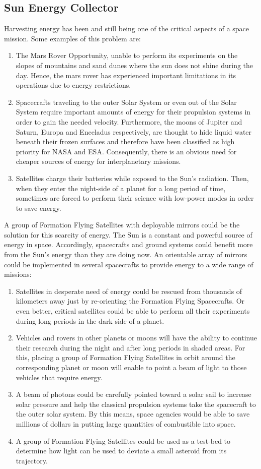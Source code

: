 \subsection{Sun Energy Collector}

Harvesting energy has been and still being one of the critical aspects
of a space mission. Some examples of this problem are: 
\begin{enumerate}
\item The Mars Rover Opportunity, unable to perform its experiments on the
slopes of mountains and sand dunes where the sun does not shine during
the day. Hence, the mars rover has experienced important limitations
in its operations due to energy restrictions.
\item Spacecrafts traveling to the outer Solar System or even out of the
Solar System require important amounts of energy for their propulsion
systems in order to gain the needed velocity. Furthermore, the moons
of Jupiter and Saturn, Europa and Enceladus respectively, are thought
to hide liquid water beneath their frozen surfaces and therefore have
been classified as high priority for NASA and ESA. Consequently, there
is an obvious need for cheaper sources of energy for interplanetary
missions.
\item Satellites charge their batteries while exposed to the Sun's radiation.
Then, when they enter the night-side of a planet for a long period
of time, sometimes are forced to perform their science with low-power
modes in order to save energy.
\end{enumerate}
A group of Formation Flying Satellites with deployable mirrors could
be the solution for this scarcity of energy. The Sun is a constant
and powerful source of energy in space. Accordingly, spacecrafts and
ground systems could benefit more from the Sun's energy than they
are doing now. An orientable array of mirrors could be implemented
in several spacecrafts to provide energy to a wide range of missions:
\begin{enumerate}
\item Satellites in desperate need of energy could be rescued from thousands
of kilometers away just by re-orienting the Formation Flying Spacecrafts.
Or even better, critical satellites could be able to perform all their
experiments during long periods in the dark side of a planet. 
\item Vehicles and rovers in other planets or moons will have the ability
to continue their research during the night and after long periods
in shaded areas. For this, placing a group of Formation Flying Satellites
in orbit around the corresponding planet or moon will enable to point
a beam of light to those vehicles that require energy.
\item A beam of photons could be carefully pointed toward a solar sail to
increase solar pressure and help the classical propulsion systems
take the spacecraft to the outer solar system. By this means, space
agencies would be able to save millions of dollars in putting large
quantities of combustible into space.
\item A group of Formation Flying Satellites could be used as a test-bed
to determine how light can be used to deviate a small asteroid from
its trajectory.
\end{enumerate}
